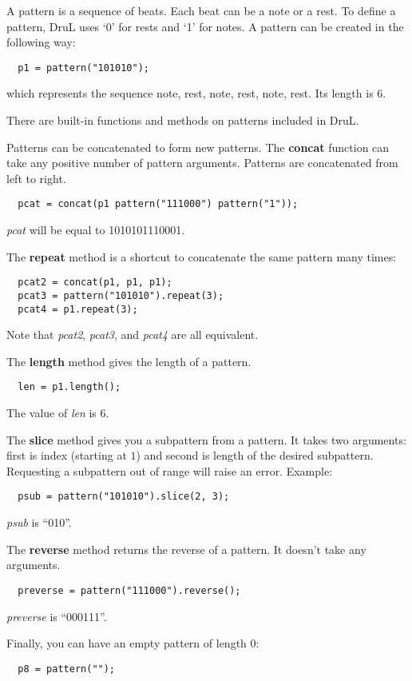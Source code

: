 A pattern is a sequence of beats.  Each beat can be a note or a rest.
To define a pattern, DruL uses `0' for rests and `1' for notes.
A pattern can be created in the following way:
\begin{verbatim}
  p1 = pattern("101010");
\end{verbatim}
which represents the sequence {note, rest, note, rest, note, rest}.
Its length is $6$.

There are built-in functions and methods on patterns included in DruL.

Patterns can be concatenated to form new patterns.  The \textbf{concat} function can take any positive number of pattern arguments.  Patterns are concatenated from left to right.
\begin{verbatim}
  pcat = concat(p1 pattern("111000") pattern("1"));
\end{verbatim}
\textit{pcat} will be equal to 1010101110001.


The \textbf{repeat} method is a shortcut to concatenate the same pattern many times:
\begin{verbatim}
  pcat2 = concat(p1, p1, p1);
  pcat3 = pattern("101010").repeat(3);
  pcat4 = p1.repeat(3);
\end{verbatim}
Note that \textit{pcat2}, \textit{pcat3}, and \textit{pcat4} are all equivalent.

The \textbf{length} method gives the length of a pattern.
\begin{verbatim}
  len = p1.length();
\end{verbatim}
The value of \textit{len} is $6$.

The \textbf{slice} method gives you a subpattern from a pattern.
It takes two arguments: first is index (starting at $1$) and second is
length of the desired subpattern. Requesting a subpattern out of range will
raise an error.  Example:
\begin{verbatim}
  psub = pattern("101010").slice(2, 3);
\end{verbatim}
\textit{psub} is ``010''.

The \textbf{reverse} method returns the reverse of a pattern.
It doesn't take any arguments.
\begin{verbatim}
  preverse = pattern("111000").reverse();
\end{verbatim}
\textit{preverse} is ``000111''.

Finally, you can have an empty pattern of length $0$:
\begin{verbatim}
  p8 = pattern("");
\end{verbatim}

